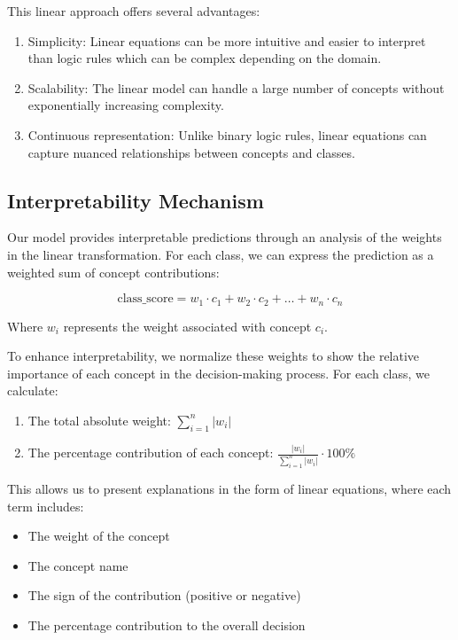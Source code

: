 \documentclass[sigconf, nonacm]{acmart}
\begin{document}
This linear approach offers several advantages: \vspace{4pt}

\begin{enumerate}
    \item Simplicity: Linear equations can be more intuitive and easier to interpret than logic rules which can be complex depending on the domain.\vspace{8pt}
    \item Scalability: The linear model can handle a large number of concepts without exponentially increasing complexity.\vspace{8pt}
    \item Continuous representation: Unlike binary logic rules, linear equations can capture nuanced relationships between concepts and classes.
\end{enumerate} \vspace{6pt}

\subsection{Interpretability Mechanism}
\vspace{2pt}
Our model provides interpretable predictions through an analysis of the weights in the linear transformation. For each class, we can express the prediction as a weighted sum of concept contributions:

\begin{equation}
    \text{class\_score} = w_1 \cdot c_1 + w_2 \cdot c_2 + \ldots + w_n \cdot c_n
\end{equation}

Where $w_i$ represents the weight associated with concept $c_i$.

To enhance interpretability, we normalize these weights to show the relative importance of each concept in the decision-making process. For each class, we calculate:\vspace{8pt}

\begin{enumerate}
    \item The total absolute weight: $\sum_{i=1}^n |w_i|$ \vspace{8pt}
    \item The percentage contribution of each concept: $\frac{|w_i|}{\sum_{i=1}^n |w_i|} \cdot 100\%$ \vspace{8pt}
\end{enumerate}

This allows us to present explanations in the form of linear equations, where each term includes:
\begin{itemize}
    \item The weight of the concept
    \item The concept name
    \item The sign of the contribution (positive or negative)
    \item The percentage contribution to the overall decision
\end{itemize} \vspace{6pt}
\end{document}
